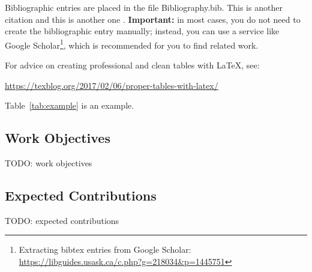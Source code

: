  
Bibliographic entries are placed in the file \textsf{Bibliography.bib}.
This is another citation \cite{McDonagh:2011dp} and this is another one \cite{Feller:2011ys}.
\textbf{Important:} in most cases, you do not need to create the bibliographic entry manually; instead, you can use a service like Google Scholar\footnote{Extracting bibtex entries from Google Scholar: \url{https://libguides.usask.ca/c.php?g=218034&p=1445751}}, which is recommended for you to find related work.

For advice on creating professional and clean tables with \LaTeX, see:

\url{https://texblog.org/2017/02/06/proper-tables-with-latex/}

Table~\ref{tab:example} is an example.

\subsection{Work Objectives}
TODO: work objectives

\subsection{Expected Contributions}
TODO: expected contributions

